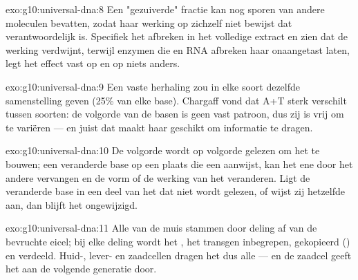 \begin{solution}{exo:g10:universal-dna:8}
Een "gezuiverde" fractie kan nog sporen van andere moleculen bevatten,
zodat haar werking op zichzelf niet bewijst dat  verantwoordelijk is.
Specifiek het  afbreken in het volledige extract en zien dat de
werking verdwijnt, terwijl enzymen die  en RNA afbreken haar
onaangetast laten, legt het effect vast op  en op niets anders.
\end{solution}

\begin{solution}{exo:g10:universal-dna:9}
Een vaste herhaling zou in elke soort dezelfde samenstelling geven (25\%
van elke base). Chargaff vond dat A+T sterk verschilt tussen soorten: de
volgorde van de basen is geen vast patroon, dus zij is vrij om te
variëren --- en juist dat maakt haar geschikt om informatie te dragen.
\end{solution}

\begin{solution}{exo:g10:universal-dna:10}
De volgorde wordt op volgorde gelezen om het  te bouwen; een
veranderde base op een plaats die een  aanwijst, kan het ene
 door het andere vervangen en de vorm of de werking van het
 veranderen. Ligt de veranderde base in een deel van het  dat
niet wordt gelezen, of wijst zij hetzelfde  aan, dan blijft het
 ongewijzigd.
\end{solution}

\begin{solution}{exo:g10:universal-dna:11}
Alle  van de muis stammen door deling af van de bevruchte eicel;
bij elke deling wordt het , het transgen inbegrepen, gekopieerd
() en verdeeld. Huid-, lever- en zaadcellen dragen het
 dus alle --- en de zaadcel geeft het aan de volgende generatie door.
\end{solution}

